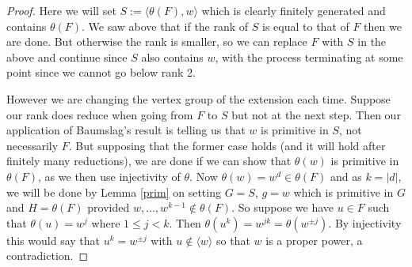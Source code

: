 \documentclass[11pt,reqno]{amsart}
\numberwithin{equation}{section}
\newcommand{\leqs}{\leqslant}
\theoremstyle{definition}
\theoremstyle{remark}
\begin{document}
\begin{proof}
    Here we will set $S:=\langle \theta(F),w\rangle$ which is clearly
    finitely generated and contains $\theta(F)$. We saw above that if
    the rank of $S$ is equal to that of $F$ then we are done. But
    otherwise the rank is smaller, so we can replace $F$ with $S$ in
    the above and continue since $S$ also contains $w$,
    with the process terminating at some point
    since we cannot go below rank 2.

    However we are changing the vertex group of the extension each time.
    Suppose our rank does reduce when going from $F$ to $S$ but not at the
    next step. Then our application of Baumslag's result is telling us that
    $w$ is primitive in $S$, not necessarily $F$. But supposing that the
    former case holds (and it will hold after finitely many reductions),
        we are done if we can show that $\theta(w)$ is
    primitive in $\theta(F)$, as we then use injectivity of $\theta$.
    Now $\theta(w)=w^d\in\theta(F)$ and as $k=|d|$,
    we will be done by Lemma \ref{prim} on setting
    $G=S$, $g=w$ which is primitive in $G$
    and $H=\theta(F)$ provided $w,\ldots ,w^{k-1}\notin \theta(F)$. So suppose
    we have $u\in F$ such that $\theta(u)=w^j$ where $1\leqs j<k$. Then
    $\theta(u^k)=w^{jk}=\theta(w^{\pm j})$. By injectivity this would say that
    $u^k=w^{\pm j}$ with $u\notin \langle w\rangle$ so that $w$ is a proper
    power, a contradiction.
    \end{proof}
    
\end{document}

